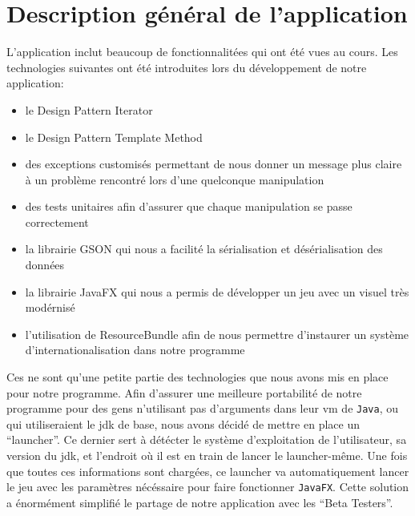 \section{Description général de l'application}
L'application inclut beaucoup de fonctionnalitées qui ont été vues au cours.
Les technologies suivantes ont été introduites lors du développement de notre application:
\begin{itemize}
\item le Design Pattern Iterator
\item le Design Pattern Template Method
\item des exceptions customisés permettant de nous donner un message plus claire à un problème rencontré lors d'une quelconque manipulation
\item des tests unitaires afin d'assurer que chaque manipulation se passe correctement
\item la librairie GSON qui nous a facilité la sérialisation et désérialisation des données
\item la librairie JavaFX qui nous a permis de développer un jeu avec un visuel très modérnisé
\item l'utilisation de ResourceBundle afin de nous permettre d'instaurer un système d'internationalisation dans notre programme
\end{itemize}
Ces ne sont qu'une petite partie des technologies que nous avons mis en place pour notre programme.
Afin d'assurer une meilleure portabilité de notre programme pour des gens n'utilisant pas d'arguments dans leur \acrshort{vm} de \verb|Java|, ou qui utiliseraient le \acrshort{jdk} de base, nous avons décidé de mettre en place un \enquote{launcher}.
Ce dernier sert à détécter le système d'exploitation de l'utilisateur, sa version du \acrshort{jdk}, et l'endroit où il est en train de lancer le launcher-même.
Une fois que toutes ces informations sont chargées, ce launcher va automatiquement lancer le jeu avec les paramètres nécéssaire pour faire fonctionner \verb|JavaFX|.
Cette solution a énormément simplifié le partage de notre application avec les \enquote{Beta Testers}.
